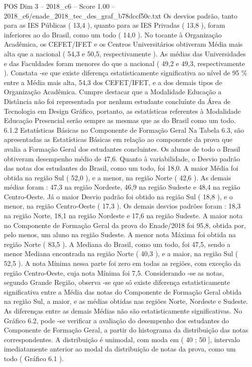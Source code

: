 \begin{textsample}{POS Dim 3 – 2018\_c6 – Score 1.00 – 2018\_c6/enade\_2018\_tec\_des\_graf\_b78dccf50c.txt}
Os desvios padrão, tanto para as IES Públicas ( 13,4 ), quanto para as IES Privadas ( 13,8 ), foram inferiores ao do Brasil, como um todo ( 14,0 ).
No tocante à Organização Acadêmica, os CEFET/IFET e os Centros Universitários obtiveram Média mais alta que a nacional ( 54,3 e 50,5, respectivamente ).
As médias das Universidades e das Faculdades foram menores do que a nacional ( 49,2 e 49,3, respectivamente ).
Constata -se que existe diferença estatisticamente significativa ao nível de 95 \% entre a Média mais alta, 54,3 dos CEFET/IFET, e a dos demais tipos de Organização Acadêmica.
Cumpre destacar que a Modalidade Educação a Distância não foi representada por nenhum estudante concluínte da Área de Tecnologia em Design Gráfico, portanto, as estatísticas referentes à Modalidade Educação Presencial serão sempre as mesmas que as do Brasil como um todo. 6.1.2 Estatísticas Básicas no Componente de Formação Geral Na Tabela 6.3, são apresentadas as Estatísticas Básicas em relação ao componente da prova que avalia a Formação Geral dos estudantes concluintes.
Os alunos de todo o Brasil obtiveram desempenho médio de 47,6.
Quanto à variabilidade, o Desvio padrão das notas dos estudantes do Brasil, como um todo, foi 18,0.
A maior Média foi obtida na região Sul ( 52,0 ), e a menor, na região Norte ( 42,6 ).
As demais médias foram : 47,3 na região Nordeste, 46,9 na região Sudeste e 48,4 na região Centro-Oeste.
Já o maior Desvio padrão foi obtido na região Sul ( 18,8 ), e o menor, na região Centro-Oeste ( 17,3 ).
Os demais desvios padrões foram : 18,3 na região Norte, 18,1 na região Nordeste e 17,6 na região Sudeste.
A maior nota no Componente de Formação Geral da prova do Enade/2018 foi 95,8, obtida por, pelo menos, um aluno na região Sudeste.
A menor nota Máxima foi obtida na região Norte ( 83,5 ).
A Mediana do Brasil, como um todo, foi 47,5, sendo a menor Mediana encontrada na região Norte ( 40,3 ), e a maior, na região Sul ( 52,5 ).
A nota Mínima nessa parte foi zero em todas as regiões, com exceção da região Centro-Oeste, cuja nota Mínima foi 7,5.
Considerando -se as notas, segundo Grande Região, observa -se que só existe diferença estatisticamente significativa entre a Média das notas do Componente de Formação Geral obtida na região Sul, a maior, e as médias obtidas nas regiões Norte, Nordeste e Sudeste.
As diferenças entre as demais Médias não são estatisticamente significativas.
No Gráfico 6.2, pode -se verificar a avaliação do desempenho dos estudantes do Componente de Formação Geral, a partir do histograma da distribuição das notas correspondentes.
A distribuição é unimodal, com moda em ( 40 ; 50 ], intervalo imediatamente anterior ao modal da distribuição de notas da prova, como um todo ( Gráfico 6.1 ).

\end{textsample}

